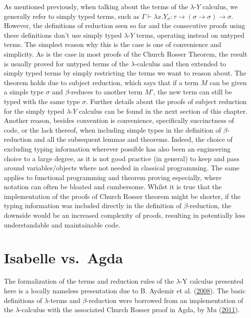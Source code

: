 \documentclass[a4paper, 12pt, twoside]{style/ociamthesis}
\theoremstyle{plain}
\theoremstyle{definition}
\theoremstyle{remark}
\newcommand{\lamy}{\lambda\text{-}Y}
\begin{document}
As mentioned previously, when talking about the terms of the \(\lamy\)
calculus, we generally refer to simply typed terms, such as
\(\Gamma \vdash \lambda x. Y_\sigma : \tau \to (\sigma \to \sigma) \to \sigma\).
However, the definitions of reduction seen so far and the consecutive
proofs using these definitions don't use simply typed \(\lamy\) terms,
operating instead on untyped terms. The simplest reason why this is the
case is one of convenience and simplicity. As is the case in most proofs
of the Church Rosser Theorem, the result is usually proved for untyped
terms of the \(\lambda\)-calculus and then extended to simply typed
terms by simply restricting the terms we want to reason about. The
theorem holds due to subject reduction, which says that if a term \(M\)
can be given a simple type \(\sigma\) and \(\beta\)-reduces to another
term \(M'\), the new term can still be typed with the same type
\(\sigma\). Further details about the proofs of subject reduction for
the simply typed \(\lamy\) calculus can be found in the next section of
this chapter.\\
Another reason, besides convention is convenience, specifically
succinctness of code, or the lack thereof, when including simple types
in the definition of \(\beta\)-reduction and all the subsequent lemmas
and theorems. Indeed, the choice of excluding typing information
wherever possible has also been an engineering choice to a large degree,
as it is not good practice (in general) to keep and pass around
variables/objects where not needed in classical programming. The same
applies to functional programming and theorem proving especially, where
notation can often be bloated and cumbersome. Whilst it is true that the
implementation of the proofs of Church Rosser theorem might be shorter,
if the typing information was included directly in the definition of
\(\beta\)-reduction, the downside would be an increased complexity of
proofs, resulting in potentially less understandable and maintainable
code.

\hypertarget{comp-agda}{\chapter{Isabelle vs.~Agda}\label{comp-agda}}

The formalization of the terms and reduction rules of the \(\lambda\)-Y
calculus presented here is a locally nameless presentation due to B.
Aydemir et al. (\protect\hyperlink{ref-aydemir08}{2008}). The basic
definitions of \(\lambda\)-terms and \(\beta\)-reduction were borrowed
from an implementation of the \(\lambda\)-calculus with the associated
Church Rosser proof in Agda, by Mu
(\protect\hyperlink{ref-shing-cheng}{2011}).
\end{document}
